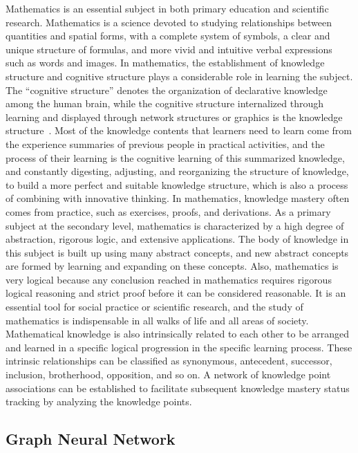 Mathematics is an essential subject in both primary education and scientific research. Mathematics is a science devoted to studying relationships between quantities and spatial forms, with a complete system of symbols, a clear and unique structure of formulas, and more vivid and intuitive verbal expressions such as words and images. In mathematics, the establishment of knowledge structure and cognitive structure plays a considerable role in learning the subject. The ``cognitive structure'' denotes the organization of declarative knowledge among the human brain, while the cognitive structure internalized through learning and displayed through network structures or graphics is the knowledge structure~\cite{tanujaya2017relationship}. Most of the knowledge contents that learners need to learn come from the experience summaries of previous people in practical activities, and the process of their learning is the cognitive learning of this summarized knowledge, and constantly digesting, adjusting, and reorganizing the structure of knowledge, to build a more perfect and suitable knowledge structure, which is also a process of combining with innovative thinking. In mathematics, knowledge mastery often comes from practice, such as exercises, proofs, and derivations. As a primary subject at the secondary level, mathematics is characterized by a high degree of abstraction, rigorous logic, and extensive applications. The body of knowledge in this subject is built up using many abstract concepts, and new abstract concepts are formed by learning and expanding on these concepts. Also, mathematics is very logical because any conclusion reached in mathematics requires rigorous logical reasoning and strict proof before it can be considered reasonable. It is an essential tool for social practice or scientific research, and the study of mathematics is indispensable in all walks of life and all areas of society. Mathematical knowledge is also intrinsically related to each other to be arranged and learned in a specific logical progression in the specific learning process. These intrinsic relationships can be classified as synonymous, antecedent, successor, inclusion, brotherhood, opposition, and so on. A network of knowledge point associations can be established to facilitate subsequent knowledge mastery status tracking by analyzing the knowledge points.

\subsection{Graph Neural Network}

